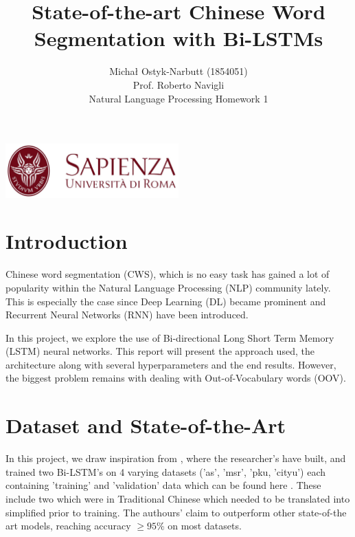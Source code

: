 \documentclass[12pt,a4paper]{article}
\begin{document}
\title{State-of-the-art Chinese Word Segmentation with Bi-LSTMs}
\author{Michał Ostyk-Narbutt (1854051)\\Prof. Roberto Navigli \\ Natural Language Processing Homework 1}

\maketitle


\begin{center}
\includegraphics[width=0.5\textwidth]{img/sapienza_logo.jpg}
\end{center}
\maketitle
\tableofcontents
\clearpage
\section{Introduction}
Chinese word segmentation (CWS), which is no easy task has gained a lot of popularity within the Natural Language Processing (NLP) community lately. This is especially the case since Deep Learning (DL) became prominent and Recurrent Neural Networks  (RNN) have been introduced.

In this project, we explore the use of Bi-directional Long Short Term Memory (LSTM) neural networks. This report will present the approach used, the architecture along with several hyperparameters and the end results. However, the biggest problem remains with dealing with Out-of-Vocabulary words (OOV).

\section{Dataset and State-of-the-Art}
In this project, we draw inspiration from \cite{paper}, where the researcher's have built, and trained two Bi-LSTM's on 4 varying datasets ('as', 'msr', 'pku, 'cityu') each containing 'training' and 'validation' data which can be found here \cite{data}. These include two which were in Traditional Chinese which needed to be translated into simplified prior to training. The authours' claim to outperform other state-of-the art models, reaching accuracy $\geq 95 \%$ on most datasets. 
\end{document}
